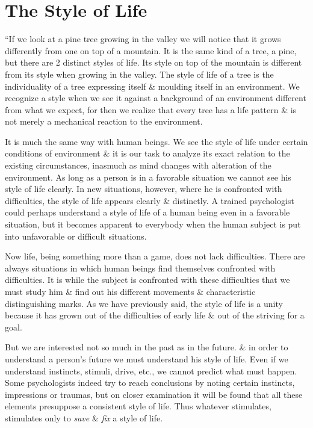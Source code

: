 \documentclass{article}
\begin{document}

\section{The Style of Life}
``If we look at a pine tree growing in the valley we will notice that it grows differently from one on top of a mountain. It is the same kind of a tree, a pine, but there are 2 distinct styles of life. Its style on top of the mountain is different from its style when growing in the valley. The style of life of a tree is the individuality of a tree expressing itself \& moulding itself in an environment. We recognize a style when we see it against a background of an environment different from what we expect, for then we realize that every tree has a life pattern \& is not merely a mechanical reaction to the environment.

It is much the same way with human beings. We see the style of life under certain conditions of environment \& it is our task to analyze its exact relation to the existing circumstances, inasmuch as mind changes with alteration of the environment. As long as a person is in a favorable situation we cannot see his style of life clearly. In new situations, however, where he is confronted with difficulties, the style of life appears clearly \& distinctly. A trained psychologist could perhaps understand a style of life of a human being even in a favorable situation, but it becomes apparent to everybody when the human subject is put into unfavorable or difficult situations.

Now life, being something more than a game, does not lack difficulties. There are always situations in which human beings find themselves confronted with difficulties. It is while the subject is confronted with these difficulties that we must study him \& find out his different movements \& characteristic distinguishing marks. As we have previously said, the style of life is a unity because it has grown out of the difficulties of early life \& out of the striving for a goal.

But we are interested not so much in the past as in the future. \& in order to understand a person's future we must understand his style of life. Even if we understand instincts, stimuli, drive, etc., we cannot predict what must happen. Some psychologists indeed try to reach conclusions by noting certain instincts, impressions or traumas, but on closer examination it will be found that all these elements presuppose a consistent style of life. Thus whatever stimulates, stimulates only to \textit{save} \& \textit{fix} a style of life.
\end{document}
